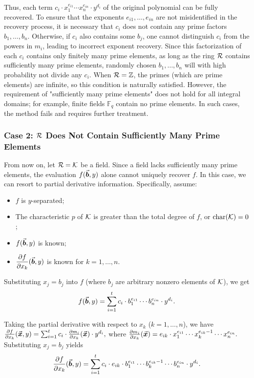 \documentclass{article}
\numberwithin{equation}{section}
\begin{document}
\begin{remark}
Thus, each term $c_i \cdot x_1^{e_{i1}} \cdots x_n^{e_{in}} \cdot y^{d_i}$ of the original polynomial can be fully recovered.
%
To ensure that the exponents $e_{i1}, \dots, e_{in}$ are not misidentified in the recovery process, it is necessary that $c_i$ does not contain any prime factors $b_1, \dots, b_n$. Otherwise, if $c_i$ also contains some $b_j$, one cannot distinguish $c_i$ from the powers in $m_i$, leading to incorrect exponent recovery.
%
Since this factorization of each $c_i$ contains only finitely many prime elements, as long as the ring ${\mathcal{R}}$ contains sufficiently many prime elements, randomly chosen $b_1, \dots, b_n$ will with high probability not divide any $c_i$. When ${\mathcal{R}} = \mathbb{Z}$, the primes (which are prime elements) are infinite, so this condition is naturally satisfied. However, the requirement of "sufficiently many prime elements" does not hold for all integral domains; for example, finite fields $\mathbb{F}_q$ contain no prime elements. In such cases, the method fails and requires further treatment.
\end{remark}

\subsubsection*{Case 2: ${\mathcal{R}}$ Does Not Contain Sufficiently Many Prime Elements}

From now on, let ${\mathcal{R}}={\mathcal{K}}$ be a field. Since a field lacks sufficiently many prime elements, the evaluation $f(\vec{\boldsymbol{b}}, y)$ alone cannot uniquely recover $f$. In this case, we can resort to partial derivative information. Specifically, assume:

\begin{itemize}
    \item[(1)] $f$ is $y$-separated;
    \item[(2)] The characteristic $p$ of ${\mathcal{K}}$ is greater than the total degree of $f$, or $\operatorname{char}({\mathcal{K}})=0$;
    \item[(3)] $f(\vec{\boldsymbol{b}}, y)$ is known;
    \item[(4)] $\dfrac{\partial f}{\partial x_k}(\vec{\boldsymbol{b}}, y)$ is known for $k=1,\dots,n$.
\end{itemize}

Substituting $x_j = b_j$ into $f$ (where $b_j$ are arbitrary nonzero elements of ${\mathcal{K}}$), we get
\[
f(\vec{\boldsymbol{b}}, y) = \sum_{i=1}^{t} c_i \cdot b_1^{e_{i1}} \cdots b_n^{e_{in}} \cdot y^{d_i}.
\]

Taking the partial derivative with respect to $x_k$ ($k=1,\dots,n$), we have
%
$\frac{\partial f}{\partial x_k}(\vec{\boldsymbol{x}}, y) = \sum_{i=1}^{t} c_i \cdot \frac{\partial m_i}{\partial x_k}(\vec{\boldsymbol{x}}) \cdot y^{d_i},$
%
where
%
$\frac{\partial m_i}{\partial x_k}(\vec{\boldsymbol{x}}) = e_{ik} \cdot x_1^{e_{i1}} \cdots x_k^{e_{ik}-1} \cdots x_n^{e_{in}}.$
%
Substituting $x_j = b_j$ yields
\[
\frac{\partial f}{\partial x_k}(\vec{\boldsymbol{b}}, y) = \sum_{i=1}^{t} c_i \cdot e_{ik} \cdot b_1^{e_{i1}} \cdots b_k^{e_{ik}-1} \cdots b_n^{e_{in}} \cdot y^{d_i}.
\]
\end{document}
